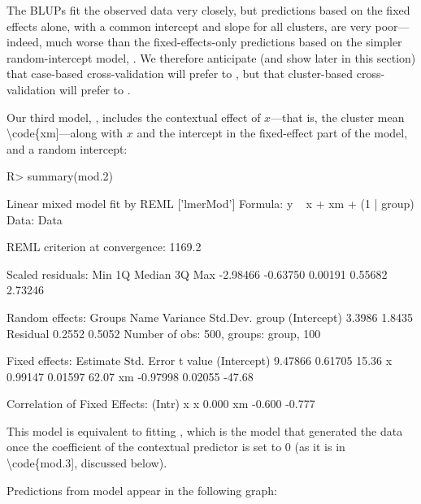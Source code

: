 \documentclass[
]{jss}
\begin{document}
The BLUPs fit the observed data very closely, but predictions based on
the fixed effects alone, with a common intercept and slope for all
clusters, are very poor---indeed, much worse than the fixed-effects-only
predictions based on the simpler random-intercept model, .
We therefore anticipate (and show later in this section) that case-based
cross-validation will prefer  to , but that
cluster-based cross-validation will prefer  to .

Our third model, , includes the contextual effect of
\(x\)---that is, the cluster mean \textbackslash code\{xm{]}---along
with \(x\) and the intercept in the fixed-effect part of the model, and
a random intercept:

\begin{CodeChunk}
\begin{CodeInput}
R> summary(mod.2)
\end{CodeInput}
\begin{CodeOutput}
Linear mixed model fit by REML ['lmerMod']
Formula: y ~ x + xm + (1 | group)
   Data: Data

REML criterion at convergence: 1169.2

Scaled residuals: 
     Min       1Q   Median       3Q      Max 
-2.98466 -0.63750  0.00191  0.55682  2.73246 

Random effects:
 Groups   Name        Variance Std.Dev.
 group    (Intercept) 3.3986   1.8435  
 Residual             0.2552   0.5052  
Number of obs: 500, groups:  group, 100

Fixed effects:
            Estimate Std. Error t value
(Intercept)  9.47866    0.61705   15.36
x            0.99147    0.01597   62.07
xm          -0.97998    0.02055  -47.68

Correlation of Fixed Effects:
   (Intr) x     
x   0.000       
xm -0.600 -0.777
\end{CodeOutput}
\end{CodeChunk}

This model is equivalent to fitting
, which is the model that
generated the data once the coefficient of the contextual predictor
 is set to 0 (as it is in \textbackslash code\{mod.3{]},
discussed below).

Predictions from model  appear in the following graph:
\end{document}
